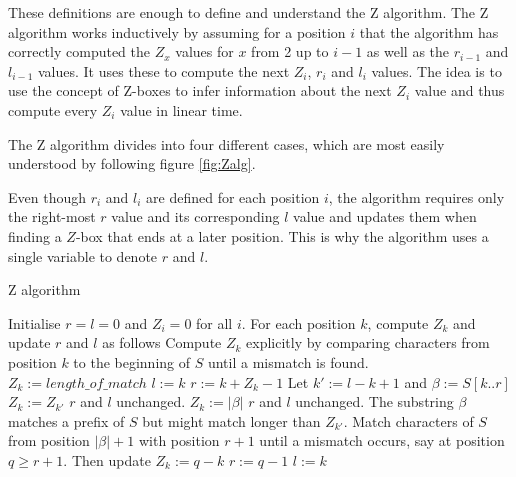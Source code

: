 These definitions are enough to define and understand the Z algorithm. The Z algorithm works inductively by assuming for a position $i$ that the algorithm has correctly computed the $Z_x$ values for $x$ from 2 up to $i-1$ as well as the $r_{i-1}$ and $l_{i-1}$ values. It uses these to compute the next $Z_i$, $r_i$ and $l_i$ values. The idea is to use the concept of Z-boxes to infer information about the next $Z_i$ value and thus compute every $Z_i$ value in linear time. 

The Z algorithm divides into four different cases, which are most easily understood by following figure \ref{fig:Zalg}. 

Even though $r_i$ and $l_i$ are defined for each position $i$, the algorithm requires only the right-most $r$ value and its corresponding $l$ value and updates them when finding a $Z$-box that ends at a later position. This is why the algorithm uses a single variable to denote $r$ and $l$. 

\begin{algorithm}
\caption{Z algorithm}\label{alg:z_alg}
\begin{algorithmic}
\State Initialise $r=l=0$ and $Z_i=0$ for all $i$. 
\State For each position $k$, compute $Z_k$ and update $r$ and $l$ as follows
 
    \State Compute $Z_k$ explicitly by comparing characters from position $k$ to the \State beginning of $S$ until a mismatch is found. 
    \State $Z_k:=length\_of\_match$
    \State $l:=k$
    \State $r:=k+Z_k-1$
    \State Let $k':=l-k+1$ and $\beta:=S[k..r]$
     
        \State $Z_k:=Z_{k'}$
        \State $r$ and $l$ unchanged. 
     
        \State $Z_k:=|\beta|$
        \State $r$ and $l$ unchanged. 
     
        \State The substring $\beta$ matches a prefix of $S$ but might match longer than $Z_{k'}$. \State Match characters of $S$ from position $|\beta|+1$ with position $r+1$ until a \State mismatch occurs, say at position $q\geq r+1$. Then update
        \State $Z_k:=q-k$
        \State $r:=q-1$
        \State $l:=k$
    \EndIf
\EndIf
\EndFor
\end{algorithmic}
\end{algorithm}


